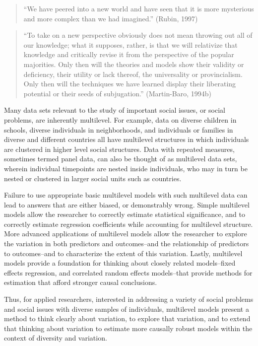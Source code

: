 \documentclass[
  letterpaper,
  DIV=11,
  numbers=noendperiod]{scrreprt}
\begin{document}
\begin{quote}
``We have peered into a new world and have seen that it is more
mysterious and more complex than we had imagined.'' (Rubin, 1997)
\end{quote}

\begin{quote}
``To take on a new perspective obviously does not mean throwing out all
of our knowledge; what it supposes, rather, is that we will relativize
that knowledge and critically revise it from the perspective of the
popular majorities. Only then will the theories and models show their
validity or deficiency, their utility or lack thereof, the universality
or provincialism. Only then will the techniques we have learned display
their liberating potential or their seeds of subjugation.''
(Martin-Baro, 1994b) 
\end{quote}

Many data sets relevant to the study of important social issues, or
social problems, are inherently multilevel. For example, data on diverse
children in schools, diverse individuals in neighborhoods, and
individuals or families in diverse and different countries all have
multilevel structures in which individuals are clustered in higher level
social structures. Data with repeated measures, sometimes termed panel
data, can also be thought of as multilevel data sets, wherein individual
timepoints are nested inside individuals, who may in turn be nested or
clustered in larger social units such as countries.

Failure to use appropriate basic multilevel models with such multilevel
data can lead to answers that are either biased, or demonstrably wrong.
Simple multilevel models allow the researcher to correctly estimate
statistical significance, and to correctly estimate regression
coefficients while accounting for multilevel structure.
 More advanced applications of multilevel models
allow the researcher to explore the variation in both predictors and
outcomes--and the relationship of predictors to outcomes--and to
characterize the extent of this variation. Lastly, multilevel models
provide a foundation for thinking about closely related models--fixed
effects regression, and correlated random effects models--that provide
methods for estimation that afford stronger causal conclusions.

Thus, for applied researchers, interested in addressing a variety of
social problems and social issues with diverse samples of individuals,
multilevel models present a method to think clearly about variation, to
explore that variation, and to extend that thinking about variation to
estimate more causally robust models within the context of diversity and
variation. 
\end{document}
